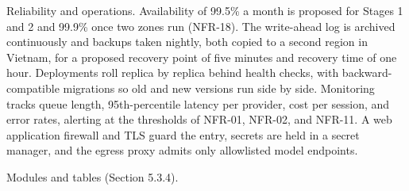 Reliability and operations. Availability of 99.5\% a month is proposed for Stages 1 and 2 and 99.9\% once two zones run (NFR-18). The write-ahead log is archived continuously and backups taken nightly, both copied to a second region in Vietnam, for a proposed recovery point of five minutes and recovery time of one hour. Deployments roll replica by replica behind health checks, with backward-\allowbreak{}compatible migrations so old and new versions run side by side. Monitoring tracks queue length, 95th-\allowbreak{}percentile latency per provider, cost per session, and error rates, alerting at the thresholds of NFR-01, NFR-02, and NFR-11. A web application firewall and TLS guard the entry, secrets are held in a secret manager, and the egress proxy admits only allowlisted model endpoints.

Modules and tables (Section 5.3.4).

